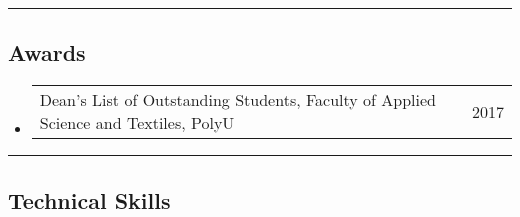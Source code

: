 \documentclass[10pt,letterpaper]{article}
\makeatletter
\newcommand{\headerrow}[2]
{\begin{tabular*}{\linewidth}{l@{\extracolsep{\fill}}r}
	#1 &
	#2 \\
\end{tabular*}}
\makeatother
\begin{document}





	



\hrule
\vspace{-1em}
\subsection*{Awards}

\begin{itemize}
	\parskip=0.1em
		\item
		\headerrow
			{Dean’s List of Outstanding Students, Faculty of Applied Science and Textiles, PolyU}
			{2017}



\end{itemize}



\hrule
\vspace{-1em}
\subsection*{Technical Skills}
\end{document}

